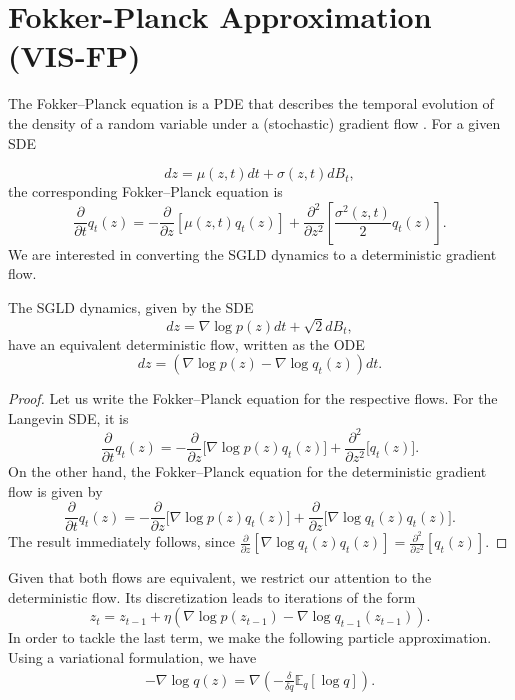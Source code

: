 
\section{Fokker-Planck Approximation (VIS-FP)}\label{app:fp}
  
  The Fokker--Planck equation is a PDE %
  that describes the temporal evolution of the density of a random variable under a (stochastic) gradient flow \parencite{pavliotis2014stochastic}. For a given SDE %
  
$$
dz = \mu(z,t)dt + \sigma(z,t)dB_t,
$$
the corresponding Fokker--Planck equation is
$$
\frac{\partial}{\partial t} q_t(z) = -\frac{\partial}{\partial z}\left[ \mu(z,t)q_t(z)\right] + \frac{\partial^2}{\partial z^2} \left[ \frac{\sigma^2(z,t)}{2} q_t(z) \right].
$$
We are interested in converting the SGLD dynamics to a deterministic gradient flow. %

\begin{Proposition}
The SGLD dynamics, given by the SDE
$$
dz = \nabla \log p(z)dt + \sqrt{2}dB_t,
$$
have an equivalent deterministic flow, written as the ODE %
$$
dz = (\nabla \log p(z) - \nabla \log q_t (z))dt.
$$
\end{Proposition}
\begin{proof}
Let us write the Fokker--Planck equation for the respective flows. For the Langevin SDE, it is 
$$
\frac{\partial}{\partial t} q_t(z) = - \frac{\partial}{\partial z} \bigg[ \nabla \log p(z) q_t(z) \bigg] + \frac{\partial^2}{\partial z^2} \bigg[ q_t(z) \bigg].
$$
On the other hand, the Fokker--Planck equation for the deterministic gradient flow is given by
$$
\frac{\partial}{\partial t} q_t(z) = - \frac{\partial}{\partial z} \bigg[ \nabla \log p(z) q_t(z)\bigg] + \frac{\partial}{\partial z} \bigg[ \nabla \log q_t(z) q_t(z)\bigg].
$$
The result immediately follows, since $ \frac{\partial}{\partial z} \left[ \nabla \log q_t(z) q_t(z)\right] = \frac{\partial^2}{\partial z^2} \left[ q_t(z) \right]$.
\end{proof}
Given that both flows are equivalent, we restrict our attention to the deterministic flow. Its discretization leads to iterations of the form
\begin{equation}\label{eq:deterministic_flow}
z_{t} = z_{t-1} + \eta (\nabla \log p(z_{t-1}) - \nabla \log q_{t-1} (z_{t-1})).
\end{equation}
In order to tackle the last term, we make the following particle approximation. Using a variational formulation, we have 
\begin{align*}
    - \nabla \log q(z) = \nabla \left( - \frac{\delta}{\delta q} \mathbb{E}_q \left[ \log q\right] \right).
\end{align*}

